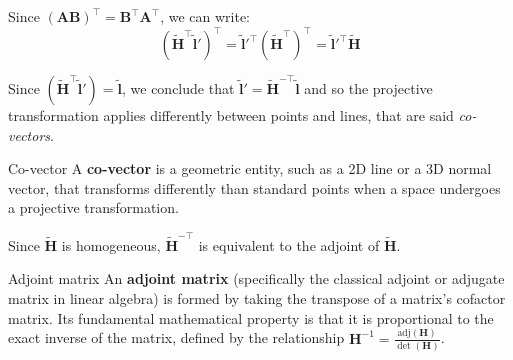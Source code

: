\begin{note}{}
    Since $(\mathbf{AB})^{\top}=\mathbf{B}^{\top}\mathbf{A}^{\top}$, we can write:
    $$(\tilde{\mathbf{H}}^{\top}\tilde{\mathbf{l}}')^{\top}=\tilde{\mathbf{l}}'^{\top}(\tilde{\mathbf{H}}^{\top})^{\top}=\tilde{\mathbf{l}}'^{\top}\tilde{\mathbf{H}}$$
\end{note}

Since $(\tilde{\mathbf{H}}^{\top}\tilde{\mathbf{l}}')=\tilde{\mathbf{l}}$, we conclude that $\tilde{\mathbf{l}}'=\tilde{\mathbf{H}}^{-\top}\tilde{\mathbf{l}}$ and so the projective transformation applies differently between points and lines, that are said \emph{co-vectors}.

\begin{definition}{Co-vector}
    A \textbf{co-vector} is a geometric entity, such as a 2D line or a 3D normal vector, that transforms differently than standard points when a space undergoes a projective transformation.
\end{definition}

Since $\tilde{\mathbf{H}}$ is homogeneous, $\tilde{\mathbf{H}}^{-\top}$ is equivalent to the adjoint of $\tilde{\mathbf{H}}$.

\begin{definition}{Adjoint matrix}
An \textbf{adjoint matrix} (specifically the classical adjoint or adjugate matrix in linear algebra) is formed by taking the transpose of a matrix's cofactor matrix. Its fundamental mathematical property is that it is proportional to the exact inverse of the matrix, defined by the relationship $\mathbf{H}^{-1} = \frac{\text{adj}(\mathbf{H})}{\det(\mathbf{H})}$.
\end{definition}

